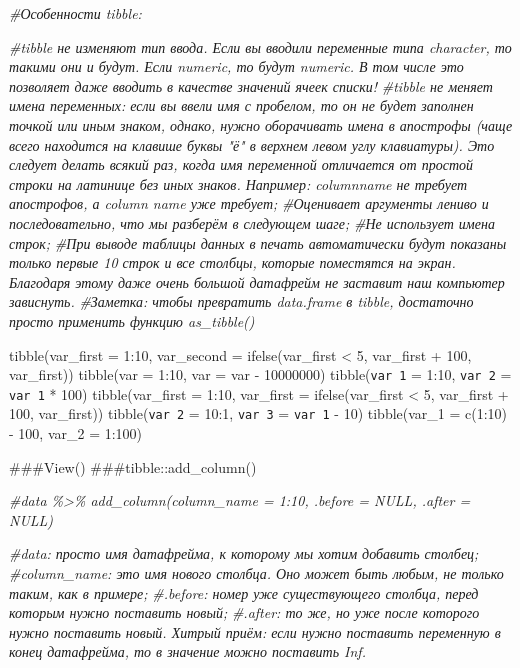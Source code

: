 \documentclass[
]{article}
\newenvironment{Shaded}{\begin{snugshade}}{\end{snugshade}}
\newcommand{\CommentTok}[1]{\textcolor[rgb]{0.56,0.35,0.01}{\textit{#1}}}
\begin{document}
\begin{Shaded}
\begin{Highlighting}[]
\CommentTok{\#Особенности tibble:}

\CommentTok{\#tibble не изменяют тип ввода. Если вы вводили переменные типа character, то такими они и будут. Если numeric, то будут numeric. В том числе это позволяет даже вводить в качестве значений ячеек списки!}
\CommentTok{\#tibble не меняет имена переменных: если вы ввели имя с пробелом, то он не будет заполнен точкой или иным знаком, однако, нужно оборачивать имена в апострофы (чаще всего находится на клавише буквы "ё" в верхнем левом углу клавиатуры). Это следует делать всякий раз, когда имя переменной отличается от простой строки на латинице без иных знаков. Например: columnname не требует апострофов, а \textasciigrave{}column name\textasciigrave{} уже требует;}
\CommentTok{\#Оценивает аргументы лениво и последовательно, что мы разберём в следующем шаге;}
\CommentTok{\#Не использует имена строк;}
\CommentTok{\#При выводе таблицы данных в печать автоматически будут показаны только первые 10 строк и все столбцы, которые поместятся на экран. Благодаря этому даже очень большой датафрейм не заставит наш компьютер зависнуть.}
\CommentTok{\#Заметка: чтобы превратить data.frame в tibble, достаточно просто применить функцию as\_tibble()}
\end{Highlighting}
\end{Shaded}

tibble(var\_first = 1:10, var\_second = ifelse(var\_first \textless{} 5,
var\_first + 100, var\_first)) tibble(var = 1:10, var = var - 10000000)
tibble(\texttt{var\ 1} = 1:10, \texttt{var\ 2} = \texttt{var\ 1} * 100)
tibble(var\_first = 1:10, var\_first = ifelse(var\_first \textless{} 5,
var\_first + 100, var\_first)) tibble(\texttt{var\ 2} = 10:1,
\texttt{var\ 3} = \texttt{var\ 1} - 10) tibble(var\_1 = c(1:10) - 100,
var\_2 = 1:100)

\#\#\#View() \#\#\#tibble::add\_column()

\begin{Shaded}
\begin{Highlighting}[]
\CommentTok{\#data \%\textgreater{}\% add\_column(column\_name = 1:10, .before = NULL, .after = NULL)}

\CommentTok{\#data: просто имя датафрейма, к которому мы хотим добавить столбец;}
\CommentTok{\#column\_name: это имя нового столбца. Оно может быть любым, не только таким, как в примере;}
\CommentTok{\#.before: номер уже существующего столбца, перед которым нужно поставить новый;}
\CommentTok{\#.after: то же, но уже после которого нужно поставить новый. Хитрый приём: если нужно поставить переменную в конец датафрейма, то в значение можно поставить Inf.}
\end{Highlighting}
\end{Shaded}
\end{document}
